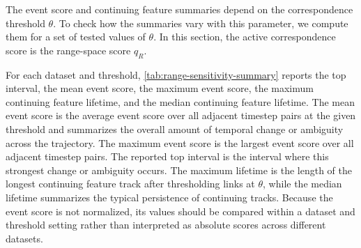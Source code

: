 \documentclass[review]{vgtc}
\begin{document}
The event score and continuing feature summaries depend on the correspondence threshold $\theta$. To check how the summaries vary with this parameter, we compute them for a set of tested values of $\theta$. In this section, the active correspondence score is the range-space score $q_R$.

For each dataset and threshold, \autoref{tab:range-sensitivity-summary} reports the top interval, the mean event score, the maximum event score, the maximum continuing feature lifetime, and the median continuing feature lifetime. The mean event score is the average event score over all adjacent timestep pairs at the given threshold and summarizes the overall amount of temporal change or ambiguity across the trajectory. The maximum event score is the largest event score over all adjacent timestep pairs. The reported top interval is the interval where this strongest change or ambiguity occurs. The maximum lifetime is the length of the longest continuing feature track after thresholding links at $\theta$, while the median lifetime summarizes the typical persistence of continuing tracks. Because the event score is not normalized, its values should be compared within a dataset and threshold setting rather than interpreted as absolute scores across different datasets.
\end{document}
